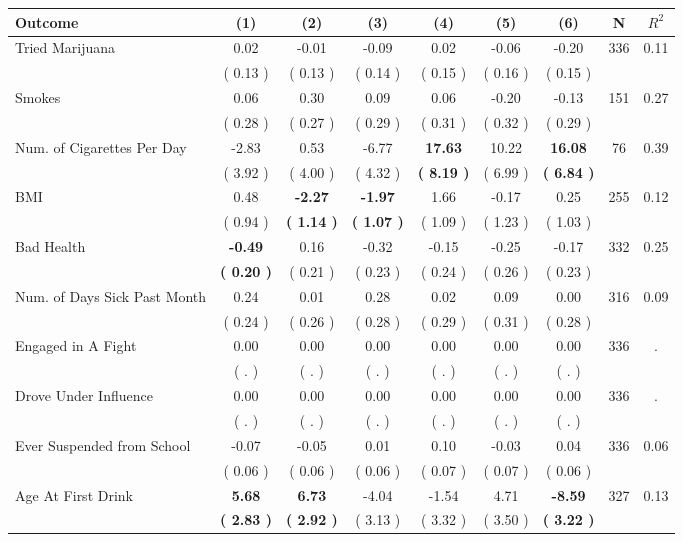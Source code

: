 \begin{tabular}{lcccccccc}
\toprule
 \textbf{Outcome} & \textbf{(1)} & \textbf{(2)} & \textbf{(3)} & \textbf{(4)} & \textbf{(5)} & \textbf{(6)} & \textbf{N} & \textbf{$ R^2$} \\
\midrule
Tried Marijuana &      0.02 &     -0.01 &     -0.09 &      0.02 &     -0.06 &     -0.20 & 336 &       0.11 \\ 
 & (     0.13 ) & (     0.13 ) & (     0.14 ) & (     0.15 ) & (     0.16 ) & (     0.15 ) & \\
Smokes &      0.06 &      0.30 &      0.09 &      0.06 &     -0.20 &     -0.13 & 151 &       0.27 \\ 
 & (     0.28 ) & (     0.27 ) & (     0.29 ) & (     0.31 ) & (     0.32 ) & (     0.29 ) & \\
Num. of Cigarettes Per Day &     -2.83 &      0.53 &     -6.77 & \textbf{    17.63} &     10.22 & \textbf{    16.08} & 76 &       0.39 \\ 
 & (     3.92 ) & (     4.00 ) & (     4.32 ) & \textbf{(     8.19 )} & (     6.99 ) & \textbf{(     6.84 )} & \\
BMI &      0.48 & \textbf{    -2.27} & \textbf{    -1.97} &      1.66 &     -0.17 &      0.25 & 255 &       0.12 \\ 
 & (     0.94 ) & \textbf{(     1.14 )} & \textbf{(     1.07 )} & (     1.09 ) & (     1.23 ) & (     1.03 ) & \\
Bad Health & \textbf{    -0.49} &      0.16 &     -0.32 &     -0.15 &     -0.25 &     -0.17 & 332 &       0.25 \\ 
 & \textbf{(     0.20 )} & (     0.21 ) & (     0.23 ) & (     0.24 ) & (     0.26 ) & (     0.23 ) & \\
Num. of Days Sick Past Month &      0.24 &      0.01 &      0.28 &      0.02 &      0.09 &      0.00 & 316 &       0.09 \\ 
 & (     0.24 ) & (     0.26 ) & (     0.28 ) & (     0.29 ) & (     0.31 ) & (     0.28 ) & \\
Engaged in A Fight &      0.00 &      0.00 &      0.00 &      0.00 &      0.00 &      0.00 & 336 &          . \\ 
 & (        . ) & (        . ) & (        . ) & (        . ) & (        . ) & (        . ) & \\
Drove Under Influence &      0.00 &      0.00 &      0.00 &      0.00 &      0.00 &      0.00 & 336 &          . \\ 
 & (        . ) & (        . ) & (        . ) & (        . ) & (        . ) & (        . ) & \\
Ever Suspended from School &     -0.07 &     -0.05 &      0.01 &      0.10 &     -0.03 &      0.04 & 336 &       0.06 \\ 
 & (     0.06 ) & (     0.06 ) & (     0.06 ) & (     0.07 ) & (     0.07 ) & (     0.06 ) & \\
Age At First Drink & \textbf{     5.68} & \textbf{     6.73} &     -4.04 &     -1.54 &      4.71 & \textbf{    -8.59} & 327 &       0.13 \\ 
 & \textbf{(     2.83 )} & \textbf{(     2.92 )} & (     3.13 ) & (     3.32 ) & (     3.50 ) & \textbf{(     3.22 )} & \\
\bottomrule
\end{tabular}
